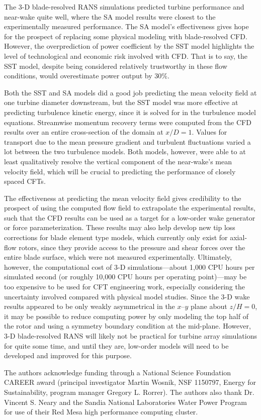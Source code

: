 \documentclass[aip,graphicx]{revtex4-1}
\begin{document}
The 3-D blade-resolved RANS simulations predicted turbine performance and
near-wake quite well, where the SA model results were closest to the
experimentally measured performance. The SA model's effectiveness gives hope for
the prospect of replacing some physical modeling with blade-resolved CFD.
However, the  overprediction of power coefficient by the SST model highlights
the level of technological and economic risk involved with CFD. That is to say,
the SST model, despite being considered relatively trustworthy in these flow
conditions, would overestimate power output by 30\%.

Both the SST and SA models did a good job predicting the mean velocity field at
one turbine diameter downstream, but the SST model was more effective at
predicting turbulence kinetic energy, since it is solved for in the turbulence
model equations. Streamwise momentum recovery terms were computed from the CFD
results over an entire cross-section of the domain at $x/D=1$. Values for
transport due to the mean pressure gradient and turbulent fluctuations varied a
lot between the two turbulence models. Both models, however, were able to at
least qualitatively resolve the vertical component of the near-wake's mean
velocity field, which will be crucial to predicting the performance of closely
spaced CFTs.

The effectiveness at predicting the mean velocity field gives credibility to the
prospect of using the computed flow field to extrapolate the experimental
results, such that the CFD results can be used as a target for a low-order wake
generator or force parameterization. These results may also help develop new tip
loss corrections for blade element type models, which currently only exist for
axial-flow rotors, since they provide access to the pressure and shear forces
over the entire blade surface, which were not measured experimentally.
Ultimately, however, the computational cost of 3-D simulations---about 1,000 CPU
hours per simulated second (or roughly 10,000 CPU hours per operating
point)---may be too expensive to be used for CFT engineering work, especially
considering the uncertainty involved compared with physical model studies. Since
the 3-D wake results appeared to be only weakly asymmetrical in the $x$--$y$
plane about $z/H=0$, it may be possible to reduce computing power by only
modeling the top half of the rotor and using a symmetry boundary condition at
the mid-plane. However, 3-D blade-resolved RANS will likely not be practical for
turbine array simulations for quite some time, and until they are, low-order
models will need to be developed and improved for this purpose.


\begin{acknowledgments}
    The authors acknowledge funding through a National Science Foundation CAREER
    award (principal investigator Martin Wosnik, NSF 1150797, Energy for
    Sustainability, program manager Gregory L. Rorrer). The authors also thank
    Dr. Vincent S. Neary and the Sandia National Laboratories Water Power
    Program for use of their Red Mesa high performance computing cluster.
\end{acknowledgments}


\end{document}
